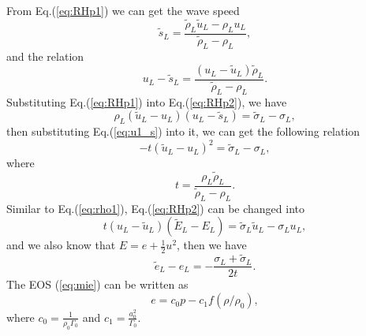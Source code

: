 \documentclass{article}
\numberwithin{equation}{section}
\numberwithin{table}{section}
\begin{document}
 From Eq.(\ref{eq:RHp1}) we can get the wave speed
  \begin{equation}
	\widetilde{s}_L = \frac{\widetilde{\rho}_L \widetilde{u}_L-\rho_Lu_L}{\widetilde{\rho}_L-\rho_L},
  \end{equation}
and the relation
\begin{equation}\label{eq:u1_s}
  u_L-\widetilde{s}_L = \frac{(u_L-\widetilde{u}_L)\widetilde{\rho}_L}{\widetilde{\rho}_L-\rho_L}. 
\end{equation}
Substituting Eq.(\ref{eq:RHp1}) into Eq.(\ref{eq:RHp2}), we have 
\begin{equation}\label{eq:rho1}
  \rho_L(\widetilde{u}_L - u_L)(u_L-\widetilde{s}_L) = \widetilde{\sigma}_L -\sigma_L,
\end{equation}
then substituting Eq.(\ref{eq:u1_s}) into it, we can get the following relation
\begin{equation}\label{eq:tu_2}
  -t(\widetilde{u}_L-u_L)^2 = \widetilde{\sigma}_L-\sigma_L,
\end{equation}
where
\begin{equation}
t=\frac{\rho_L \widetilde{\rho}_L}{\widetilde{\rho}_L-\rho_L}.
\end{equation}
Similar to Eq.(\ref{eq:rho1}), Eq.(\ref{eq:RHp2}) can be changed into 
\begin{equation}
  t(u_L-\widetilde{u}_L)(\widetilde{E}_L-E_L) =\widetilde{\sigma}_L\widetilde{u}_L-\sigma_Lu_L,
\end{equation}
and we also know that $E = e+\frac{1}{2}u^2$, then we have 
\begin{equation}\label{eq:e21}
  \widetilde{e}_L-e_L= -\frac{\sigma_L+\widetilde{\sigma}_L}{2t}.
\end{equation}
The EOS (\ref{eq:mie}) can be written as
\begin{equation} \label{eq:eos1}
  e=c_0 p-c_1f(\rho/\rho_0),
\end{equation}
where $c_0=\frac{1}{\rho_0\Gamma_0}$ and $c_1=\frac{a_0^2}{\Gamma_0}$.  
\end{document}
